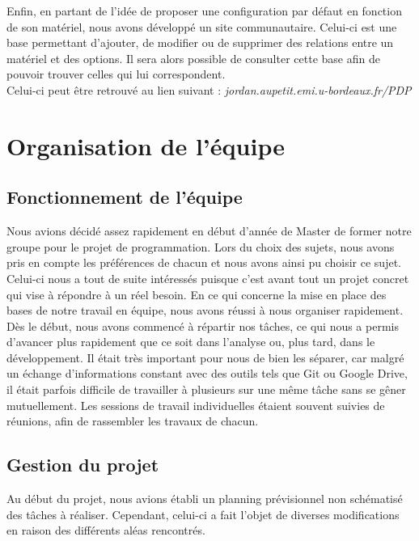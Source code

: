 \documentclass[17pts]{report}
\begin{document}
Enfin, en partant de l'idée de proposer une configuration par défaut en
fonction de son matériel, nous avons développé un site communautaire.  Celui-ci
est une base permettant d'ajouter, de modifier ou de supprimer des relations
entre un matériel et des options. Il sera alors possible de consulter cette
base afin de pouvoir trouver celles qui lui correspondent.\\
Celui-ci peut être retrouvé au lien suivant :
\textit{jordan.aupetit.emi.u-bordeaux.fr/PDP}

\chapter{Organisation de l'équipe}\thispagestyle{IHA-fancy-style}
\label{cha:Organisation de l'équipe}
    \section{Fonctionnement de l'équipe}
    \label{sec:Fonctionnement de l'équipe}

Nous avions décidé assez rapidement en début d'année de Master de former notre
groupe pour le projet de programmation. Lors du choix des sujets, nous avons
pris en compte les préférences de chacun et nous avons ainsi pu choisir ce
sujet. Celui-ci nous a tout de suite intéressés puisque c'est avant tout un
projet concret qui vise à répondre à un réel besoin.  En ce qui concerne la
mise en place des bases de notre travail en équipe, nous avons réussi à nous
organiser rapidement.  \\

Dès le début, nous avons commencé à répartir nos tâches, ce qui nous a permis
d’avancer plus rapidement que ce soit dans l’analyse ou, plus tard, dans le
développement. Il était très important pour nous de bien les séparer, car malgré
un échange d’informations constant avec des outils tels que Git ou Google
Drive, il était parfois difficile de travailler à plusieurs sur une même tâche
sans se gêner mutuellement. Les sessions de travail individuelles étaient
souvent suivies de réunions, afin de rassembler les travaux de chacun.  \\

\section{Gestion du projet}
\label{sec:Gestion du projet}
Au début du projet, nous avions établi un planning prévisionnel non schématisé
des tâches à réaliser. Cependant, celui-ci a fait l'objet de diverses
modifications en raison des différents aléas rencontrés.
\end{document}
